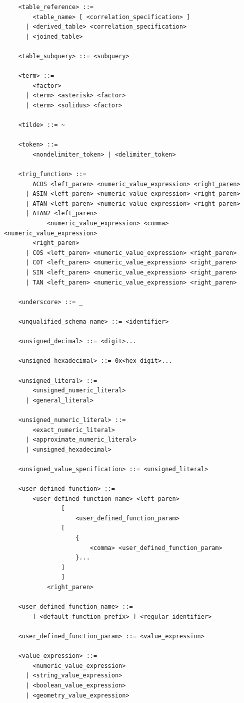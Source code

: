 \documentclass[11pt,a4paper]{ivoa}
\begin{document}
\begin{verbatim}
    <table_reference> ::=
        <table_name> [ <correlation_specification> ]
      | <derived_table> <correlation_specification>
      | <joined_table>

    <table_subquery> ::= <subquery>

    <term> ::=
        <factor>
      | <term> <asterisk> <factor>
      | <term> <solidus> <factor>

    <tilde> ::= ~

    <token> ::=
        <nondelimiter_token> | <delimiter_token>

    <trig_function> ::=
        ACOS <left_paren> <numeric_value_expression> <right_paren>
      | ASIN <left_paren> <numeric_value_expression> <right_paren>
      | ATAN <left_paren> <numeric_value_expression> <right_paren>
      | ATAN2 <left_paren>
            <numeric_value_expression> <comma> <numeric_value_expression>
        <right_paren>
      | COS <left_paren> <numeric_value_expression> <right_paren>
      | COT <left_paren> <numeric_value_expression> <right_paren>
      | SIN <left_paren> <numeric_value_expression> <right_paren>
      | TAN <left_paren> <numeric_value_expression> <right_paren>

    <underscore> ::= _

    <unqualified_schema name> ::= <identifier>

    <unsigned_decimal> ::= <digit>...

    <unsigned_hexadecimal> ::= 0x<hex_digit>...

    <unsigned_literal> ::=
        <unsigned_numeric_literal>
      | <general_literal>

    <unsigned_numeric_literal> ::=
        <exact_numeric_literal>
      | <approximate_numeric_literal>
      | <unsigned_hexadecimal>

    <unsigned_value_specification> ::= <unsigned_literal>

    <user_defined_function> ::=
        <user_defined_function_name> <left_paren>
                [
                    <user_defined_function_param>
                [
                    {
                        <comma> <user_defined_function_param>
                    }...
                ]
                ]
            <right_paren>

    <user_defined_function_name> ::=
        [ <default_function_prefix> ] <regular_identifier>

    <user_defined_function_param> ::= <value_expression>

    <value_expression> ::=
        <numeric_value_expression>
      | <string_value_expression>
      | <boolean_value_expression>
      | <geometry_value_expression>


\end{verbatim}
\end{document}
